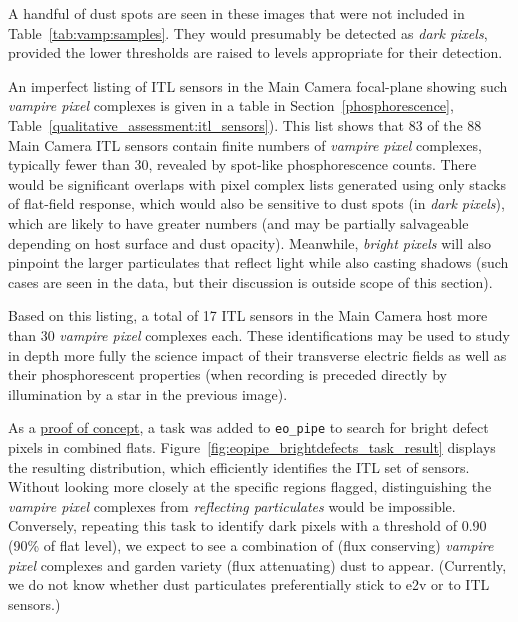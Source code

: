 A handful of dust spots are seen in these images that were not included in Table~\ref{tab:vamp:samples}. They would presumably be detected as {\it dark pixels}, provided the lower thresholds are raised to levels appropriate for their detection.


%
%

An imperfect listing of ITL sensors in the Main Camera focal-plane showing such {\it vampire pixel} complexes is given in a table in Section~\ref{phosphorescence}, Table~\ref{qualitative_assessment:itl_sensors}). This list shows that 83 of the 88 Main Camera ITL sensors contain finite numbers of {\it vampire pixel} complexes, typically fewer than 30, revealed by spot-like phosphorescence counts. There would be significant overlaps with pixel complex lists generated using only stacks of flat-field response, which would also be sensitive to dust spots (in {\it dark pixels}), which are likely to have greater numbers (and may be partially salvageable depending on host surface and dust opacity). Meanwhile, {\it bright pixels} will also pinpoint the larger particulates that reflect light while also casting shadows (such cases are seen in the data, but their discussion is outside scope of this section). 

Based on this listing, a total of 17 ITL sensors in the Main Camera host more than 30 {\it vampire pixel} complexes each. These identifications may be used to study in depth more fully the science impact of their transverse electric fields as well as their phosphorescent properties (when recording is preceded directly by illumination by a star in the previous image).

As a \href{https://rubin-obs.slack.com/archives/C07QJMQAP6E/p1731348605966989?thread_ts=1730921120.364949&cid=C07QJMQAP6E}{proof of concept}, a task was added to {\tt eo\_pipe} to search for bright defect pixels in combined flats. Figure~\ref{fig:eopipe_brightdefects_task_result} displays the resulting distribution, which efficiently identifies the ITL set of sensors. Without looking more closely at the specific regions flagged, distinguishing the {\it vampire pixel} complexes from {\it reflecting particulates} would be impossible. Conversely, repeating this task to identify dark pixels with a threshold of 0.90 (90\% of flat level), we expect to see a combination of (flux conserving) {\it vampire pixel} complexes and garden variety (flux attenuating) dust to appear. (Currently, we do not know whether dust particulates preferentially stick to e2v or to ITL sensors.)

